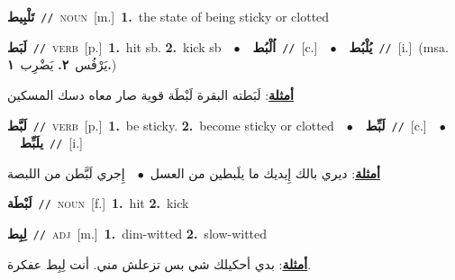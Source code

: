 \documentclass[10pt,a4paper,twoside]{article} %
\begin{document}
\begin{multicols}{2}
{\setlength\topsep{0pt}\textbf{\foreignlanguage{arabic}{تَلْبِيط}}\ {\color{gray}\texttt{//}\color{black}}\ \textsc{noun}\ [m.]\ \textbf{1.}~the state of being sticky or clotted\ } \vspace{2mm}

{\setlength\topsep{0pt}\textbf{\foreignlanguage{arabic}{لَبَط}}\ {\color{gray}\texttt{//}\color{black}}\ \textsc{verb}\ [p.]\ \textbf{1.}~hit sb.  \textbf{2.}~kick sb\ \ $\bullet$\ \ \setlength\topsep{0pt}\textbf{\foreignlanguage{arabic}{اُلْبُط}}\ {\color{gray}\texttt{//}\color{black}}\ [c.]\ \ $\bullet$\ \ \setlength\topsep{0pt}\textbf{\foreignlanguage{arabic}{يُلْبُط}}\ {\color{gray}\texttt{//}\color{black}}\ [i.]\ \color{gray}(msa. \foreignlanguage{arabic}{يَرْفُس}~\foreignlanguage{arabic}{\textbf{٢.}}  \foreignlanguage{arabic}{يَضْرِب}~\foreignlanguage{arabic}{\textbf{١.}})\color{black}\  \begin{flushright}\color{gray}\foreignlanguage{arabic}{\textbf{\underline{\foreignlanguage{arabic}{أمثلة}}}: لَبَطته البقرة لَبْطَة قوية صار معاه دسك المسكين}\end{flushright}\color{black}} \vspace{2mm}

{\setlength\topsep{0pt}\textbf{\foreignlanguage{arabic}{لَبَّط}}\ {\color{gray}\texttt{//}\color{black}}\ \textsc{verb}\ [p.]\ \textbf{1.}~be sticky.  \textbf{2.}~become sticky or clotted\ \ $\bullet$\ \ \setlength\topsep{0pt}\textbf{\foreignlanguage{arabic}{لَبِّط}}\ {\color{gray}\texttt{//}\color{black}}\ [c.]\ \ $\bullet$\ \ \setlength\topsep{0pt}\textbf{\foreignlanguage{arabic}{يلَبِّط}}\ {\color{gray}\texttt{//}\color{black}}\ [i.]\  \begin{flushright}\color{gray}\foreignlanguage{arabic}{\textbf{\underline{\foreignlanguage{arabic}{أمثلة}}}: ديري بالك إِيديك ما يلَبطين من العسل\ $\bullet$\ \  إِجري لَبَّطن من اللبصة}\end{flushright}\color{black}} \vspace{2mm}

{\setlength\topsep{0pt}\textbf{\foreignlanguage{arabic}{لَبْطَة}}\ {\color{gray}\texttt{//}\color{black}}\ \textsc{noun}\ [f.]\ \textbf{1.}~hit  \textbf{2.}~kick\ } \vspace{2mm}

{\setlength\topsep{0pt}\textbf{\foreignlanguage{arabic}{لِبِط}}\ {\color{gray}\texttt{//}\color{black}}\ \textsc{adj}\ [m.]\ \textbf{1.}~dim-witted  \textbf{2.}~slow-witted\  \begin{flushright}\color{gray}\foreignlanguage{arabic}{\textbf{\underline{\foreignlanguage{arabic}{أمثلة}}}: بدي أحكيلك شي بس تزعلش مني. أنت لِبِط عفكرة.}\end{flushright}\color{black}} \vspace{2mm}


\end{multicols}
\end{document}
